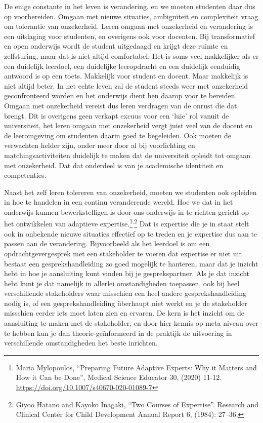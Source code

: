 \documentclass[empirical, authordate, ]{new-jote-article}
\begin{document}
	De enige constante in het leven is verandering, en we moeten studenten daar dus op voorbereiden. Omgaan met nieuwe situaties, ambiguïteit en complexiteit vraag om tolerantie van onzekerheid. Leren omgaan met onzekerheid en verandering is een uitdaging voor studenten, en overigens ook voor docenten. Bij transformatief en open onderwijs wordt de student uitgedaagd en krijgt deze ruimte en zelfsturing, maar dat is niet altijd comfortabel. Het is soms veel makkelijker als er een duidelijk leerdoel, een duidelijke leeropdracht en een duidelijk eenduidig antwoord is op een toets. Makkelijk voor student en docent. Maar makkelijk is niet altijd beter. In het echte leven zal de student steeds weer met onzekerheid geconfronteerd worden en het onderwijs dient hen daarop voor te bereiden. Omgaan met onzekerheid vereist dus leren verdragen van de onrust die dat brengt. Dit is overigens geen verkapt excuus voor een ‘luie' rol vanuit de universiteit, het leren omgaan met onzekerheid vergt juist veel van de docent en de leeromgeving om studenten daarin goed te begeleiden. Ook moeten de verwachten helder zijn, onder meer door al bij voorlichting en matchingsactiviteiten duidelijk te maken dat de universiteit opleidt tot omgaan met onzekerheid. Dat dat onderdeel is van je academische identiteit en competenties.



	Naast het zelf leren tolereren van onzekerheid, moeten we studenten ook opleiden in hoe te handelen in een continu veranderende wereld. Hoe we dat in het onderwijs kunnen bewerkstelligen is door ons onderwijs in te richten gericht op het ontwikkelen van adaptieve expertise.\footnote{Maria Mylopoulos, “Preparing Future Adaptive Experts: Why it Matters and How it Can be Done”, Medical Science Educator 30, (2020) 11-12. \href{https://doi.org/10.1007/s40670-020-01089-7}{https://doi.org/10.1007/s40670-020-01089-7}}\textsuperscript{,}\footnote{Giyoo Hatano and Kayoko Inagaki, “Two Courses of Expertise”. Research and Clinical Center for Child Development Annual Report 6, (1984): 27--36.} Dat is expertise die je in staat stelt ook in onbekende nieuwe situaties effectief op te treden en je expertise dus aan te passen aan de verandering. Bijvoorbeeld als het leerdoel is om een opdrachtgevergesprek met een stakeholder te voeren dat expertise er niet uit bestaat een gesprekshandleiding zo goed mogelijk te hanteren, maar dat je inzicht hebt in hoe je aansluiting kunt vinden bij je gesprekspartner. Als je dat inzicht hebt kunt je dat namelijk in allerlei omstandigheden toepassen, ook bij heel verschillende stakeholders waar misschien een heel andere gesprekshandleiding nodig is, of een gesprekshandleiding überhaupt niet werkt en je de stakeholder misschien eerder iets moet laten zien en ervaren. De kern is het inzicht om de aansluiting te maken met de stakeholder, en door hier kennis op meta niveau over te hebben kun je dan theorie-geïnformeerd in de praktijk de uitvoering in verschillende omstandigheden het beste inrichten.
\end{document}
